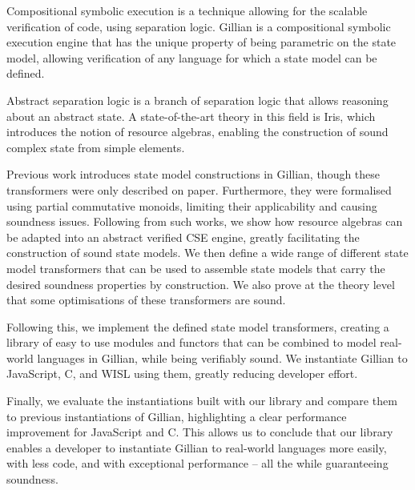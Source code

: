 Compositional symbolic execution is a technique allowing for the scalable verification of code, using separation logic. Gillian is a compositional symbolic execution engine that has the unique property of being parametric on the state model, allowing verification of any language for which a state model can be defined.

Abstract separation logic is a branch of separation logic that allows reasoning about an abstract state. A state-of-the-art theory in this field is Iris, which introduces the notion of resource algebras, enabling the construction of sound complex state from simple elements.

Previous work introduces state model constructions in Gillian, though these transformers were only described on paper. Furthermore, they were formalised using partial commutative monoids, limiting their applicability and causing soundness issues. Following from such works, we show how resource algebras can be adapted into an abstract verified CSE engine, greatly facilitating the construction of sound state models. We then define a wide range of different state model transformers that can be used to assemble state models that carry the desired soundness properties by construction. We also prove at the theory level that some optimisations of these transformers are sound.

Following this, we implement the defined state model transformers, creating a library of easy to use modules and functors that can be combined to model real-world languages in Gillian, while being verifiably sound. We instantiate Gillian to JavaScript, C, and WISL using them, greatly reducing developer effort.

Finally, we evaluate the instantiations built with our library and compare them to previous instantiations of Gillian, highlighting a clear performance improvement for JavaScript and C. This allows us to conclude that our library enables a developer to instantiate Gillian to real-world languages more easily, with less code, and with exceptional performance -- all the while guaranteeing soundness.

